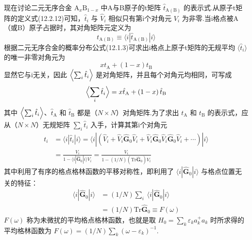 现在讨论二元无序合金 $\mathrm{A}_{x}\mathrm{B}_{1-x}$ 中A与B原子的t矩阵 $\hat{t}_{\mathrm{A}(\mathrm{B})}$ 的表示式.从原子t矩阵的定义式(12.2.12)可知，$\hat{t}_{i}$ 与 $\hat{V}_{i}$ 相似只有第i个对角元 $V_{i}$ 为非零.当i格点被A（或B）原子占据时，其对角矩阵元定义为
\begin{equation}
  t_{\mathrm{A}(\mathrm{B})}\equiv\langle i|\hat{t}_{\mathrm{A}(\mathrm{B})}|i\rangle
\end{equation}
根据二元无序合金的概率分布公式(12.1.3)可求出i格点上原子t矩阵的无规平均 $\langle\hat{t}_{i}\rangle$ 的唯一非零对角元为
\begin{equation}
  xt_{\mathrm{A}}+\left(1-x\right)t_{\mathrm{B}}
\end{equation}
显然它与i无关，因此 $\Bigl\langle\sum_{i}\hat{t}_{i}\Bigr\rangle$ 是对角矩阵，并且每个对角元均相同，可写成
\begin{equation}
  \Bigl\langle\sum_{i}\hat{t}_{i}\Bigr\rangle=x\hat{t}_{\mathrm{A}}+\left(1-x\right)\hat{t}_{\mathrm{B}}
\end{equation}
其中 $\Bigl\langle\sum_{i}\hat{t}_{i}\Bigr\rangle$、$\hat{t}_{\mathrm{A}}$ 和 $\hat{t}_{\mathrm{B}}$ 都是（$N\times N$）对角矩阵.为了求出 $t_{\mathrm{A}}$ 和 $t_{\mathrm{B}}$ 的表示式，应从（$N\times N$）无规矩阵 $\sum_{i}\hat{t}_{i}$ 入手，计算其第i个对角元
\begin{equation}
\begin{aligned}
  t_{i}&=\langle i|\hat{t}_{i}|i\rangle
  =\langle i|\left(\hat{V}_{i}+\hat{V}_{i}\hat{\boldsymbol{G}}_{0}\hat{V}_{i}
  +\hat{V}_{i}\hat{\boldsymbol{G}}_{0}\hat{V}_{i}\hat{\boldsymbol{G}}_{0}\hat{V}_{i}+\cdots\right)|i\rangle\\
  &=\frac{V_{i}}{1-\langle i|\hat{\boldsymbol{G}}_{0}|i\rangle V_{i}}
  =\frac{V_{i}}{1-\left(1/N\right)\left(\mathrm{Tr}\hat{\boldsymbol{G}}_{0}\right)V_{i}}
\end{aligned}
\end{equation}
其中利用了有序的格点格林函数的平移对称性，即利用了 $\langle i|\hat{\boldsymbol{G}}_{0}|i\rangle$ 与格点位置无关的特征：
\begin{equation}
\begin{aligned}
  \langle i|\hat{\boldsymbol{G}}_{0}|i\rangle
  &=\left(1/N\right)\sum_{i}\ \langle i|\hat{\boldsymbol{G}}_{0}|i\rangle\\
  &=\left(1/N\right)\mathrm{Tr}\hat{\boldsymbol{G}}_{0}\equiv F\left(\omega\right)
\end{aligned}
\end{equation}
$F\left(\omega\right)$ 称为未微扰的平均格点格林函数，也就是取 $H_{0}=\sum_{k}\varepsilon_{k}a_{k}^{+}a_{k}$ 时所求得的平均格林函数为 $F\left(\omega\right)=\left(1/N\right)\sum_{k}\left(\omega-\varepsilon_{k}\right)^{-1}$.

